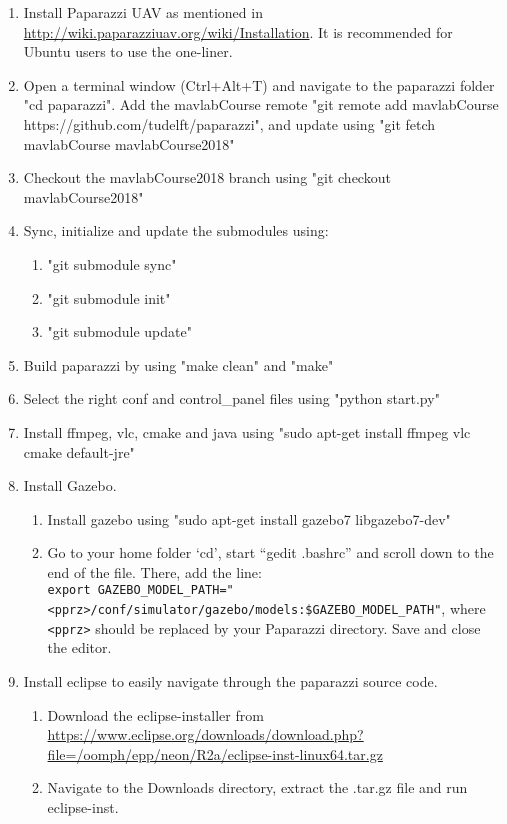 \documentclass{article}
\begin{document}
\begin{enumerate}
\item{Install Paparazzi UAV as mentioned in \url{http://wiki.paparazziuav.org/wiki/Installation}. It is recommended for Ubuntu users to use the one-liner.}
\item{Open a terminal window (Ctrl+Alt+T) and navigate to the paparazzi folder "cd paparazzi". Add the mavlabCourse remote "git remote add mavlabCourse https://github.com/tudelft/paparazzi", and update using "git fetch mavlabCourse mavlabCourse2018"}
\item{Checkout the mavlabCourse2018 branch using "git checkout mavlabCourse2018"}
\item{Sync, initialize and update the submodules using:
\begin{enumerate}
\item{"git submodule sync"}
\item{"git submodule init"}
\item{"git submodule update"}
\end{enumerate}
}
\item{Build paparazzi by using "make clean" and "make"}
\item{Select the right conf and control\_panel files using "python start.py"}
\item{Install ffmpeg, vlc, cmake and java using "sudo apt-get install ffmpeg vlc cmake default-jre"}
\item{Install Gazebo.
\begin{enumerate}
\item{Install gazebo using "sudo apt-get install gazebo7 libgazebo7-dev"}
\item{Go to your home folder `cd', start ``gedit .bashrc'' and scroll down to the end of the file. There, add the line:\\
\verb|export GAZEBO_MODEL_PATH="<pprz>/conf/simulator/gazebo/models:$GAZEBO_MODEL_PATH"|, where \verb"<pprz>" should be replaced by your Paparazzi directory. Save and close the editor.}
\end{enumerate}}
\item{Install eclipse to easily navigate through the paparazzi source code.
\begin{enumerate}
\item{Download the eclipse-installer from \url{https://www.eclipse.org/downloads/download.php?file=/oomph/epp/neon/R2a/eclipse-inst-linux64.tar.gz}}
\item{Navigate to the Downloads directory, extract the .tar.gz file and run eclipse-inst.}

\end{enumerate}}
\end{enumerate}
\end{document}
